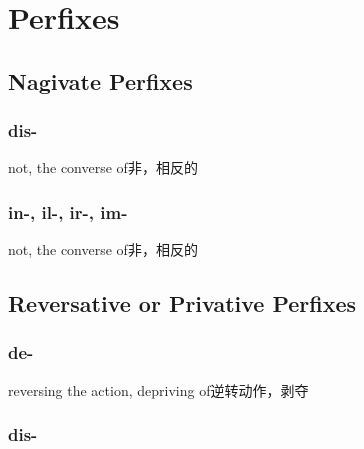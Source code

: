 \chapter{Perfixes}
\section{Nagivate Perfixes}
\subsection{dis-}

\begin{nlist}{not, the converse of}{非，相反的}
\end{nlist}

\subsection{in-, il-, ir-, im-}

\begin{nlist}{not, the converse of}{非，相反的}
\end{nlist}

\section{Reversative or Privative Perfixes}

\subsection{de-}

\begin{nlist}{reversing the action, depriving of}{逆转动作，剥夺}
\end{nlist}

\subsection{dis-}

